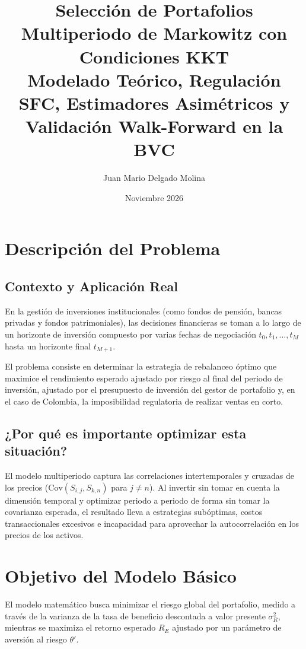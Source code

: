 \documentclass[11pt,a4paper]{article}
\title{Selección de Portafolios Multiperiodo de Markowitz con Condiciones KKT\\
\large Modelado Teórico, Regulación SFC, Estimadores Asimétricos y Validación Walk-Forward en la BVC}
\author{Juan Mario Delgado Molina}
\date{Noviembre 2026}
\begin{document}
\maketitle

\section{Descripción del Problema}

\subsection{Contexto y Aplicación Real}
En la gestión de inversiones institucionales (como fondos de pensión, bancas privadas y fondos patrimoniales), las decisiones financieras se toman a lo largo de un horizonte de inversión compuesto por varias fechas de negociación $t_0, t_1, \dots, t_M$ hasta un horizonte final $t_{M+1}$.

El problema consiste en determinar la estrategia de rebalanceo óptimo que maximice el rendimiento esperado ajustado por riesgo al final del periodo de inversión, ajustado por el presupuesto de inversión del gestor de portafolio y, en el caso de Colombia, la imposibilidad regulatoria de realizar ventas en corto.

\subsection{¿Por qué es importante optimizar esta situación?}
El modelo multiperiodo captura las correlaciones intertemporales y cruzadas de los precios ($\mathrm{Cov}(S_{i,j}, S_{k,n})$ para $j \neq n$). Al invertir sin tomar en cuenta la dimensión temporal y optimizar periodo a periodo de forma sin tomar la covarianza esperada, el resultado lleva a estrategias subóptimas, costos transaccionales excesivos e incapacidad para aprovechar la autocorrelación en los precios de los activos.

\section{Objetivo del Modelo Básico}
El modelo matemático busca minimizar el riesgo global del portafolio, medido a través de la varianza de la tasa de beneficio descontada a valor presente $\sigma_R^2$, mientras se maximiza el retorno esperado $R_E$ ajustado por un parámetro de aversión al riesgo $\theta'$.
\end{document}

